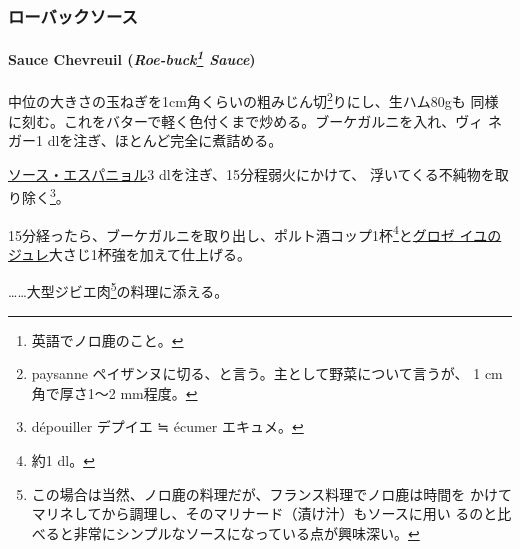 \begin{recette}
\maeaki

\hypertarget{ux30edux30fcux30d0ux30c3ux30afux30bdux30fcux30b9}{%
\subsubsection{ローバックソース}\label{ux30edux30fcux30d0ux30c3ux30afux30bdux30fcux30b9}}

\hypertarget{sauce-chevreuil-roe-buck19-sauce}{%
\paragraph[Sauce Chevreuil ()]{\texorpdfstring{Sauce Chevreuil
(\emph{Roe-buck\footnote{英語でノロ鹿のこと。}
Sauce})}{Sauce Chevreuil (Roe-buck Sauce)}}\label{sauce-chevreuil-roe-buck19-sauce}}


中位の大きさの玉ねぎを1cm角くらいの粗みじん切\footnote{paysanne
  ペイザンヌに切る、と言う。主として野菜について言うが、 1
  cm角で厚さ1〜2 mm程度。}りにし、生ハム80gも
同様に刻む。これをバターで軽く色付くまで炒める。ブーケガルニを入れ、ヴィ
ネガー1\undemi{} dlを注ぎ、ほとんど完全に煮詰める。

\protect\hyperlink{sauce-espagnole}{ソース・エスパニョル}3
dlを注ぎ、15分程弱火にかけて、 浮いてくる不純物を取り除く\footnote{dépouiller
  デプイエ ≒ écumer エキュメ。}。

15分経ったら、ブーケガルニを取り出し、ポルト酒コップ1杯\footnote{約1
  dl。}と\protect\hyperlink{}{グロゼ
イユのジュレ}大さじ1杯強を加えて仕上げる。

\ldots{}\ldots{}大型ジビエ肉\footnote{この場合は当然、ノロ鹿の料理だが、フランス料理でノロ鹿は時間を
  かけてマリネしてから調理し、そのマリナード（漬け汁）もソースに用い
  るのと比べると非常にシンプルなソースになっている点が興味深い。}の料理に添える。
\end{recette}